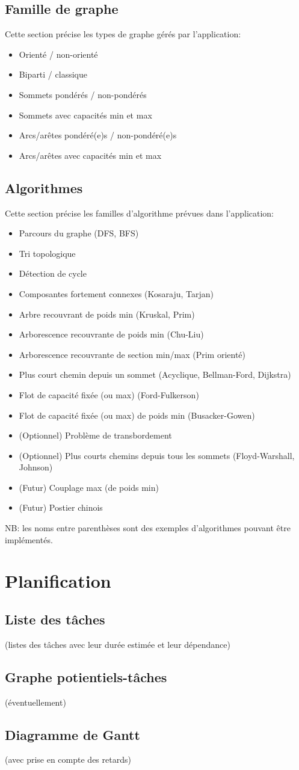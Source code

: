 \documentclass[french]{article}
\begin{document}
		\subsection{Famille de graphe}
			Cette section précise les types de graphe gérés par l'application:
			\begin{itemize}
				\item Orienté / non-orienté
				\item Biparti / classique
				\item Sommets pondérés / non-pondérés
				\item Sommets avec capacités min et max
				\item Arcs/arêtes pondéré(e)s / non-pondéré(e)s
				\item Arcs/arêtes avec capacités min et max
			\end{itemize}
			
		\subsection{Algorithmes}
			Cette section précise les familles d'algorithme prévues dans l'application:
			\begin{itemize}
				\item Parcours du graphe (DFS, BFS)
				\item Tri topologique
				\item Détection de cycle
				\item Composantes fortement connexes (Kosaraju, Tarjan) 
				\item Arbre recouvrant de poids min (Kruskal, Prim)
				\item Arborescence recouvrante de poids min (Chu-Liu)
				\item Arborescence recouvrante de section min/max (Prim orienté)
				\item Plus court chemin depuis un sommet (Acyclique, Bellman-Ford, Dijkstra)
				\item Flot de capacité fixée (ou max) (Ford-Fulkerson)
				\item Flot de capacité fixée (ou max) de poids min (Busacker-Gowen)
				\item (Optionnel) Problème de transbordement
				\item (Optionnel) Plus courts chemins depuis tous les sommets (Floyd-Warshall, Johnson)
				\item (Futur) Couplage max (de poids min)
				\item (Futur) Postier chinois
			\end{itemize}
			NB: les noms entre parenthèses sont des exemples d'algorithmes pouvant être implémentés.
		
	\section{Planification}
		\subsection{Liste des tâches}
			(listes des tâches avec leur durée estimée et leur dépendance)
		\subsection{Graphe potientiels-tâches}
			(éventuellement)
		\subsection{Diagramme de Gantt}
			(avec prise en compte des retards)
			
\end{document}

